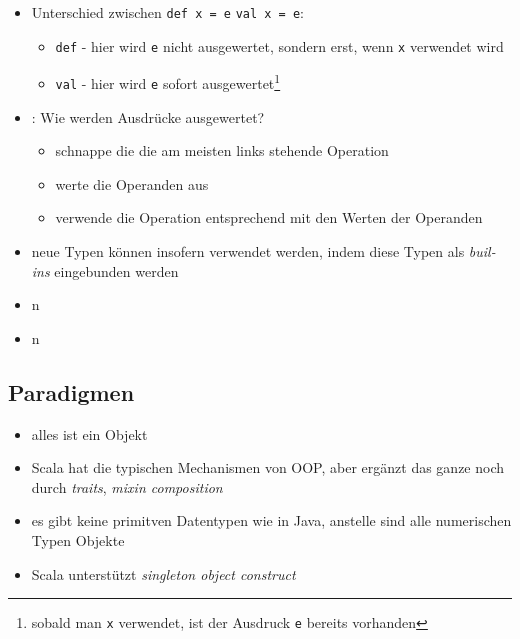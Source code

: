 \begin{itemize}
  \item Unterschied zwischen \texttt{def x = e} \und \texttt{val x = e}:
  \begin{itemize}
    \item \texttt{def} - hier wird \texttt{e} nicht ausgewertet, sondern erst,
    wenn \texttt{x} verwendet wird
    \item \texttt{val} - hier wird \texttt{e} sofort 
    ausgewertet\footnote{sobald man \texttt{x} verwendet, ist der Ausdruck 
    \texttt{e} bereits vorhanden}
  \end{itemize}
  \item {}: Wie werden Ausdrücke ausgewertet? \begin{itemize}
    \item schnappe die die am meisten links stehende Operation
    \item werte die Operanden aus
    \item verwende die Operation entsprechend mit den Werten der Operanden
  \end{itemize}
  \item neue Typen können insofern verwendet werden,
  indem diese Typen als \textit{buil-ins} eingebunden
  werden
  \item n
  \item n
\end{itemize}
  

\subsection{Paradigmen}


\begin{itemize}
  \item alles ist ein Objekt
  \item Scala hat die typischen Mechanismen von OOP, aber ergänzt das ganze
  noch durch \textit{traits}, \textit{mixin composition}
  \item es gibt keine primitven Datentypen wie in Java, anstelle sind alle 
  numerischen Typen Objekte
  \item Scala unterstützt \textit{singleton object construct}
\end{itemize}




